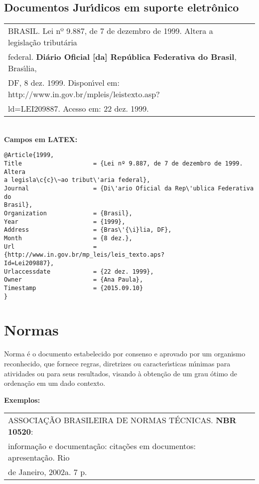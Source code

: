 \subsection{Documentos Jur\'{\i}dicos em suporte eletr\^onico}

\begin{tabular}{|l|c|} \hline
	BRASIL. Lei nº 9.887, de 7 de dezembro de 1999. Altera a legisla\c{c}\~ao tribut\'aria\\
	federal. \textbf{Di\'ario Oficial [da] Rep\'ublica Federativa do Brasil}, Bras\'{\i}lia,\\
	DF, 8 dez. 1999. Dispon\'{\i}vel em: http://www.in.gov.br/mpleis/leistexto.asp?\\
	ld=LEI209887. Acesso em: 22 dez. 1999. 
	\\\hline
\end{tabular} \\

\textbf{Campos em LATEX:} 

\begin{verbatim}
@Article{1999,
Title                    = {Lei nº 9.887, de 7 de dezembro de 1999. Altera 
a legisla\c{c}\~ao tribut\'aria federal},
Journal                  = {Di\'ario Oficial da Rep\'ublica Federativa do 
Brasil},
Organization             = {Brasil},
Year                     = {1999},
Address                  = {Bras\'{\i}lia, DF},
Month                    = {8 dez.},
Url                      = {http://www.in.gov.br/mp_leis/leis_texto.aps?
Id=Lei209887},
Urlaccessdate            = {22 dez. 1999},
Owner                    = {Ana Paula},
Timestamp                = {2015.09.10}
}
\end{verbatim}


\section{Normas}

Norma \'e o documento estabelecido por consenso e aprovado por um organismo reconhecido, que fornece regras, diretrizes ou caracter\'{\i}sticas m\'{\i}nimas para atividades ou para seus resultados, visando \`a obten\c{c}\~ao de um grau \'otimo de ordena\c{c}\~ao em um dado contexto.

\textbf{Exemplos:} \\

\begin{tabular}{|l|c|} \hline
	ASSOCIA\c{C}\~AO BRASILEIRA DE NORMAS T\'ECNICAS. \textbf{NBR 10520}: \\informa\c{c}\~ao e documenta\c{c}\~ao: cita\c{c}\~oes em documentos: apresenta\c{c}\~ao. Rio \\de Janeiro, 2002a. 7 p. 
	\\\hline
\end{tabular} \\

